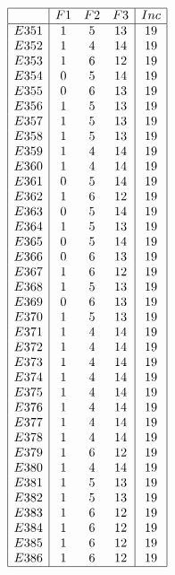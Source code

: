 \documentclass[12pt]{article}
\begin{document}
\begin{multicols}{3}
\begin{equation*}
\begin{array}{|c|ccc|c|}
\hline
&F1&F2&F3&Inc\\
\hline
E351&1&5&13&19\\
E352&1&4&14&19\\
E353&1&6&12&19\\
E354&0&5&14&19\\
E355&0&6&13&19\\
E356&1&5&13&19\\
E357&1&5&13&19\\
E358&1&5&13&19\\
E359&1&4&14&19\\
E360&1&4&14&19\\
E361&0&5&14&19\\
E362&1&6&12&19\\
E363&0&5&14&19\\
E364&1&5&13&19\\
E365&0&5&14&19\\
E366&0&6&13&19\\
E367&1&6&12&19\\
E368&1&5&13&19\\
E369&0&6&13&19\\
E370&1&5&13&19\\
E371&1&4&14&19\\
E372&1&4&14&19\\
E373&1&4&14&19\\
E374&1&4&14&19\\
E375&1&4&14&19\\
E376&1&4&14&19\\
E377&1&4&14&19\\
E378&1&4&14&19\\
E379&1&6&12&19\\
E380&1&4&14&19\\
E381&1&5&13&19\\
E382&1&5&13&19\\
E383&1&6&12&19\\
E384&1&6&12&19\\
E385&1&6&12&19\\
E386&1&6&12&19\\
\hline
\end{array}
\end{equation*}


\end{multicols}
\end{document}
